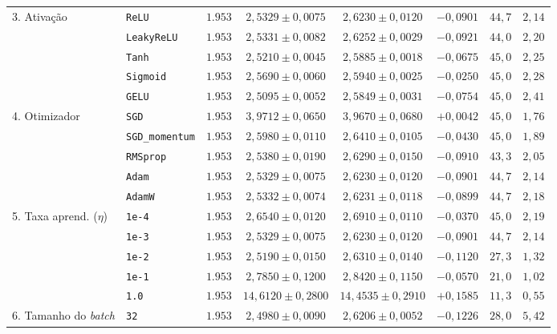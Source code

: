 \documentclass[12pt,a4paper]{article}
\begin{document}
\begin{table}[H]
{\begin{tabular}{llcccccc}
\midrule
\multirow{5}{*}{3. Ativação} 
 & \texttt{ReLU} & $1.953$ & $2{,}5329 \pm 0{,}0075$ & $2{,}6230 \pm 0{,}0120$ & $-0{,}0901$ & $44{,}7$ & $2{,}14$ \\
 & \texttt{LeakyReLU} & $1.953$ & $2{,}5331 \pm 0{,}0082$ & $2{,}6252 \pm 0{,}0029$ & $-0{,}0921$ & $44{,}0$ & $2{,}20$ \\
 & \texttt{Tanh} & $1.953$ & $2{,}5210 \pm 0{,}0045$ & $2{,}5885 \pm 0{,}0018$ & $-0{,}0675$ & $45{,}0$ & $2{,}25$ \\
 & \texttt{Sigmoid} & $1.953$ & $2{,}5690 \pm 0{,}0060$ & $2{,}5940 \pm 0{,}0025$ & $-0{,}0250$ & $45{,}0$ & $2{,}28$ \\
 & \texttt{GELU} & $1.953$ & $2{,}5095 \pm 0{,}0052$ & $2{,}5849 \pm 0{,}0031$ & $-0{,}0754$ & $45{,}0$ & $2{,}41$ \\
\midrule
\multirow{5}{*}{4. Otimizador} 
 & \texttt{SGD} & $1.953$ & $3{,}9712 \pm 0{,}0650$ & $3{,}9670 \pm 0{,}0680$ & $+0{,}0042$ & $45{,}0$ & $1{,}76$ \\
 & \texttt{SGD\_momentum} & $1.953$ & $2{,}5980 \pm 0{,}0110$ & $2{,}6410 \pm 0{,}0105$ & $-0{,}0430$ & $45{,}0$ & $1{,}89$ \\
 & \texttt{RMSprop} & $1.953$ & $2{,}5380 \pm 0{,}0190$ & $2{,}6290 \pm 0{,}0150$ & $-0{,}0910$ & $43{,}3$ & $2{,}05$ \\
 & \texttt{Adam} & $1.953$ & $2{,}5329 \pm 0{,}0075$ & $2{,}6230 \pm 0{,}0120$ & $-0{,}0901$ & $44{,}7$ & $2{,}14$ \\
 & \texttt{AdamW} & $1.953$ & $2{,}5332 \pm 0{,}0074$ & $2{,}6231 \pm 0{,}0118$ & $-0{,}0899$ & $44{,}7$ & $2{,}18$ \\
\midrule
\multirow{5}{*}{5. Taxa aprend. ($\eta$)} 
 & \texttt{1e-4} & $1.953$ & $2{,}6540 \pm 0{,}0120$ & $2{,}6910 \pm 0{,}0110$ & $-0{,}0370$ & $45{,}0$ & $2{,}19$ \\
 & \texttt{1e-3} & $1.953$ & $2{,}5329 \pm 0{,}0075$ & $2{,}6230 \pm 0{,}0120$ & $-0{,}0901$ & $44{,}7$ & $2{,}14$ \\
 & \texttt{1e-2} & $1.953$ & $2{,}5190 \pm 0{,}0150$ & $2{,}6310 \pm 0{,}0140$ & $-0{,}1120$ & $27{,}3$ & $1{,}32$ \\
 & \texttt{1e-1} & $1.953$ & $2{,}7850 \pm 0{,}1200$ & $2{,}8420 \pm 0{,}1150$ & $-0{,}0570$ & $21{,}0$ & $1{,}02$ \\
 & \texttt{1.0} & $1.953$ & $14{,}6120 \pm 0{,}2800$ & $14{,}4535 \pm 0{,}2910$ & $+0{,}1585$ & $11{,}3$ & $0{,}55$ \\
\midrule
\multirow{5}{*}{6. Tamanho do \textit{batch}} 
 & \texttt{32} & $1.953$ & $2{,}4980 \pm 0{,}0090$ & $2{,}6206 \pm 0{,}0052$ & $-0{,}1226$ & $28{,}0$ & $5{,}42$ \\

\end{tabular}}
\end{table}
\end{document}
